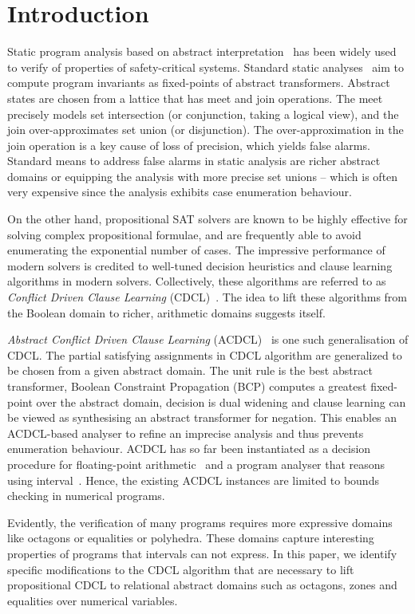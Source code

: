 \section{Introduction}

%
Static program analysis based on abstract interpretation~\cite{CC77} has
been widely used to verify of properties of safety-critical systems. 
Standard static analyses~\cite{se2011} aim to compute program invariants as
fixed-points of abstract transformers.  Abstract states are chosen from a
lattice that has meet and join operations.  The meet precisely models set
intersection (or conjunction, taking a logical view), and the join
over-approximates set union (or disjunction).  The over-approximation in the
join operation is a key cause of loss of precision, which yields false
alarms.  Standard means to address false alarms in static analysis are
richer abstract domains or equipping the analysis with more precise set
unions -- which is often very expensive since the analysis exhibits case
enumeration behaviour.

%
On the other hand, propositional SAT solvers are known to be highly
effective for solving complex propositional formulae, and are frequently
able to avoid enumerating the exponential number of cases.  The impressive
performance of modern solvers is credited to well-tuned decision heuristics
and clause learning algorithms in modern solvers.  Collectively, these
algorithms are referred to as \emph{Conflict Driven Clause Learning}
(CDCL)~\cite{cdcl}. The idea to lift these algorithms from the Boolean
domain to richer, arithmetic domains suggests itself.

\emph{Abstract Conflict Driven Clause Learning} (ACDCL)~\cite{dhk2013-popl}
is one such generalisation of CDCL.  The partial satisfying assignments in
CDCL algorithm are generalized to be chosen from a given abstract domain. 
The unit rule is the best abstract transformer, Boolean Constraint
Propagation (BCP) computes a greatest fixed-point over the abstract domain,
decision is dual widening and clause learning can be viewed as synthesising
an abstract transformer for negation.  This enables an ACDCL-based analyser
to refine an imprecise analysis and thus prevents enumeration behaviour. 
ACDCL has so far been instantiated as a decision procedure for
floating-point arithmetic~\cite{DBLP:journals/fmsd/BrainDGHK14} and a
program analyser that reasons using interval~\cite{tacas12}.  Hence, the
existing ACDCL instances are limited to bounds checking in numerical
programs.

Evidently, the verification of many programs requires more expressive
domains like octagons or equalities or polyhedra.  These domains capture
interesting properties of programs that intervals can not express.  In this
paper, we identify specific modifications to the CDCL algorithm that are
necessary to lift propositional CDCL to relational abstract domains such as
octagons, zones and equalities over numerical variables.
